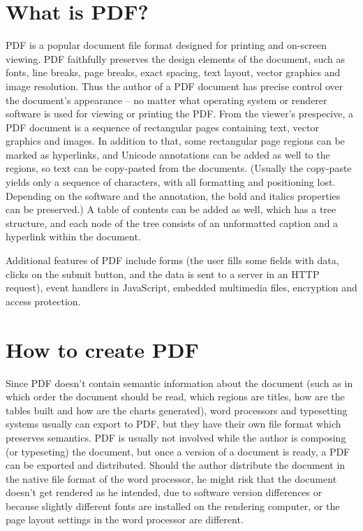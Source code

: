 \documentclass{article}
\begin{document}
\section{What is PDF?}

PDF is a popular document file format designed for printing and on-screen
viewing. PDF faithfully preserves the design elements of the document, such
as fonts, line breaks, page breaks, exact spacing, text layout, vector
graphics and image resolution. Thus the author of a PDF document has
precise control over the document's appearance -- no matter what operating
system or renderer software is used for viewing or printing the PDF. From
the viewer's prespecive, a PDF document is a sequence of rectangular pages
containing text, vector graphics and images. In addition to that, some
rectangular page regions can be marked as hyperlinks, and Unicode
annotations can be added as well to the regions, so text can be copy-pasted
from the documents. (Usually the copy-paste yields only a sequence of
characters, with all formatting and positioning lost. Depending on the
software and the annotation, the bold and italics properties can be
preserved.) A table of contents can be added as well, which has a tree
structure, and each node of the tree consists of an unformatted caption and
a hyperlink within the document.

Additional features of PDF include forms (the user fills some fields with
data, clicks on the submit button, and the data is sent to a server in an
HTTP request), event handlers in JavaScript, embedded multimedia files,
encryption and access protection.

\section{How to create PDF}

Since PDF doesn't contain semantic information about the document (such as
in which order the document should be read, which regions are titles, how
are the tables built and how are the charts generated), word processors and
typesetting systems usually can export to PDF, but they have their own file
format which preserves semantics. PDF is usually not involved while the
author is composing (or typeseting) the document, but once a version of a
document is ready, a PDF can be exported and distributed. Should the author
distribute the document in the native file format of the word processor, he
might risk that the document doesn't get rendered as he intended, due to
software version differences or because slightly different fonts are
installed on the rendering computer, or the page layout settings in the word
processor are different.
\end{document}
